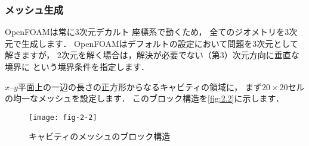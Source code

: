 \subsubsection{メッシュ生成}
\label{sssec:2.1.1.1}
%
OpenFOAMは常に3次元デカルト
%
座標系で動くため，
全てのジオメトリを3次元で生成します．
OpenFOAMはデフォルトの設定において問題を3次元として解きますが，
2次元を解く場合は，解決が必要でない（第3）次元方向に垂直な境界に
%
%
という境界条件を指定します．

$x$--$y$平面上の一辺の長さの正方形からなるキャビティの領域に，
まず$20 \times 20$セルの均一なメッシュを設定します．
このブロック構造を\autoref{fig:2.2}に示します．


\begin{figure}[ht]
 \texttt{[image: fig-2-2]}
 \caption{キャビティのメッシュのブロック構造}
 \label{fig:2.2}
\end{figure}


